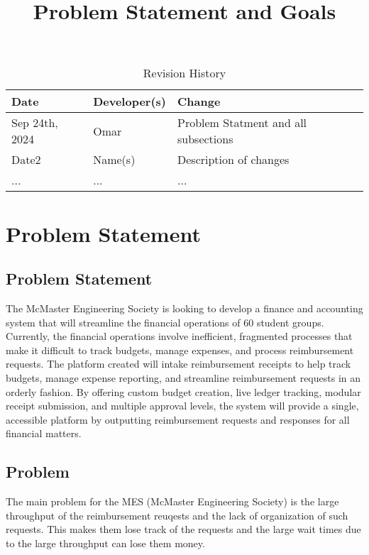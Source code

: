 \documentclass{article}
\title{Problem Statement and Goals\\\progname}
\author{\authname}
\date{}
\begin{document}
\maketitle

\begin{table}[hp]
\caption{Revision History} \label{TblRevisionHistory}
\begin{tabularx}{\textwidth}{llX}
\toprule
\textbf{Date} & \textbf{Developer(s)} & \textbf{Change}\\
\midrule
Sep 24th, 2024 & Omar & Problem Statment and all subsections \\
Date2 & Name(s) & Description of changes\\
... & ... & ...\\
\bottomrule
\end{tabularx}
\end{table}

\section{Problem Statement}

\subsection{Problem Statement}

\hspace{0.5cm} The McMaster Engineering Society is looking to develop a finance and accounting system that will streamline the financial operations of 60 student groups. Currently, the financial operations involve inefficient, fragmented processes that make it difficult to track budgets, manage expenses, and process reimbursement requests. The platform created will intake reimbursement receipts to help track budgets, manage expense reporting, and streamline reimbursement requests in an orderly fashion. By offering custom budget creation, live ledger tracking, modular receipt submission, and multiple approval levels, the system will provide a single, accessible platform by outputting reimbursement requests and responses for all financial matters.

\subsection{Problem}

\hspace{0.5cm} The main problem for the MES (McMaster Engineering Society) is 
the large throughput of the reimbursement reuqests and the lack of organization of such requests. 
This makes them lose track of the requests and the large wait times due to the large throughput can lose 
them money.  
\end{document}
